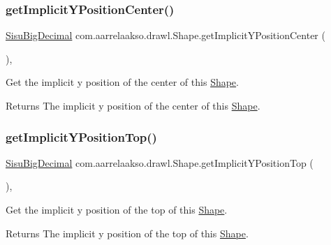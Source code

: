 \subsubsection{\texorpdfstring{get\+Implicit\+Y\+Position\+Center()}{getImplicitYPositionCenter()}}
{\footnotesize\ttfamily \hyperlink{classcom_1_1aarrelaakso_1_1drawl_1_1_sisu_big_decimal}{Sisu\+Big\+Decimal} com.\+aarrelaakso.\+drawl.\+Shape.\+get\+Implicit\+Y\+Position\+Center (\begin{DoxyParamCaption}{ }\end{DoxyParamCaption})\hspace{0.3cm}{\ttfamily [protected]}, {\ttfamily [inherited]}}

Get the implicit y position of the center of this \hyperlink{classcom_1_1aarrelaakso_1_1drawl_1_1_shape}{Shape}.

\begin{DoxyReturn}{Returns}
The implicit y position of the center of this \hyperlink{classcom_1_1aarrelaakso_1_1drawl_1_1_shape}{Shape}. 
\end{DoxyReturn}
\mbox{\label{classcom_1_1aarrelaakso_1_1drawl_1_1_shape_a5ffc02627cca0723e3555b5d04ba2b75}} 
\subsubsection{\texorpdfstring{get\+Implicit\+Y\+Position\+Top()}{getImplicitYPositionTop()}}
{\footnotesize\ttfamily \hyperlink{classcom_1_1aarrelaakso_1_1drawl_1_1_sisu_big_decimal}{Sisu\+Big\+Decimal} com.\+aarrelaakso.\+drawl.\+Shape.\+get\+Implicit\+Y\+Position\+Top (\begin{DoxyParamCaption}{ }\end{DoxyParamCaption})\hspace{0.3cm}{\ttfamily [protected]}, {\ttfamily [inherited]}}

Get the implicit y position of the top of this \hyperlink{classcom_1_1aarrelaakso_1_1drawl_1_1_shape}{Shape}.

\begin{DoxyReturn}{Returns}
The implicit y position of the top of this \hyperlink{classcom_1_1aarrelaakso_1_1drawl_1_1_shape}{Shape}. 
\end{DoxyReturn}
\mbox{\label{classcom_1_1aarrelaakso_1_1drawl_1_1_shape_a2b19d5964ac46d545a7bae3133df6532}} 
